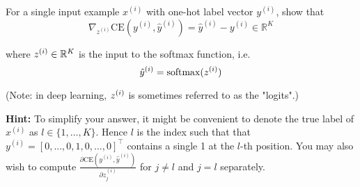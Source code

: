\item {} 

For a single input example $x^{(i)}$ with one-hot label vector $y^{(i)}$, show that $$\nabla_{z^{(i)}} \mathrm{CE}(y^{(i)}, \hat{y}^{(i)}) = \hat{y}^{(i)} - y^{(i)} \in \mathbb{R}^K$$

where $z^{(i)} \in \mathbb{R}^K$ is the input to the softmax function, i.e. $$\hat{y}^{(i)} = \mathrm{softmax}(z^{(i)})$$

(Note: in deep learning, $z^{(i)}$ is sometimes referred to as the "logits".)

\textbf{Hint:} To simplify your answer, it might be convenient to denote the true label of $x^{(i)}$ as $l \in \{1,\dots,K\}$. Hence $l$ is the index such that that $y^{(i)} = [0,...,0,1,0,...,0]^\top$ contains a single 1 at the $l$-th position. You may also wish to compute $\displaystyle \frac{\partial \mathrm{CE}(y^{(i)}, \hat{y}^{(i)})}{\partial z^{(i)}_j}$ for $j\neq l$ and $j=l$ separately.
